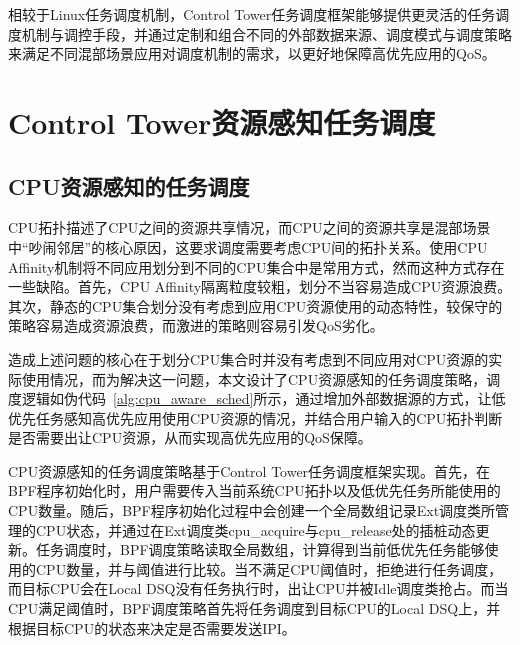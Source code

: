 相较于Linux任务调度机制，Control Tower任务调度框架能够提供更灵活的任务调度机制与调控手段，并通过定制和组合不同的外部数据来源、调度模式与调度策略来满足不同混部场景应用对调度机制的需求，以更好地保障高优先应用的QoS。

\section{Control Tower资源感知任务调度}



\subsection{CPU资源感知的任务调度} 


CPU拓扑描述了CPU之间的资源共享情况，而CPU之间的资源共享是混部场景中“吵闹邻居”的核心原因，这要求调度需要考虑CPU间的拓扑关系。使用CPU Affinity机制将不同应用划分到不同的CPU集合中是常用方式，然而这种方式存在一些缺陷。首先，CPU Affinity隔离粒度较粗，划分不当容易造成CPU资源浪费。其次，静态的CPU集合划分没有考虑到应用CPU资源使用的动态特性，较保守的策略容易造成资源浪费，而激进的策略则容易引发QoS劣化。

造成上述问题的核心在于划分CPU集合时并没有考虑到不同应用对CPU资源的实际使用情况，而为解决这一问题，本文设计了CPU资源感知的任务调度策略，调度逻辑如伪代码~\ref{alg:cpu_aware_sched}所示，通过增加外部数据源的方式，让低优先任务感知高优先应用使用CPU资源的情况，并结合用户输入的CPU拓扑判断是否需要出让CPU资源，从而实现高优先应用的QoS保障。

CPU资源感知的任务调度策略基于Control Tower任务调度框架实现。首先，在BPF程序初始化时，用户需要传入当前系统CPU拓扑以及低优先任务所能使用的CPU数量。随后，BPF程序初始化过程中会创建一个全局数组记录Ext调度类所管理的CPU状态，并通过在Ext调度类cpu\_acquire与cpu\_release处的插桩动态更新。任务调度时，BPF调度策略读取全局数组，计算得到当前低优先任务能够使用的CPU数量，并与阈值进行比较。当不满足CPU阈值时，拒绝进行任务调度，而目标CPU会在Local DSQ没有任务执行时，出让CPU并被Idle调度类抢占。而当CPU满足阈值时，BPF调度策略首先将任务调度到目标CPU的Local DSQ上，并根据目标CPU的状态来决定是否需要发送IPI。

